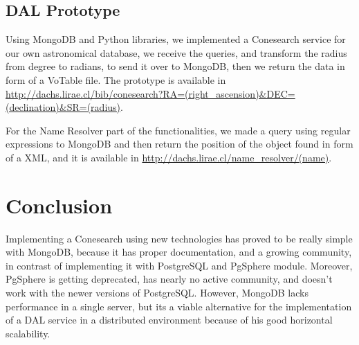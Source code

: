 \documentclass[11pt,twoside]{article}
\begin{document}
\subsection{DAL Prototype}	
  Using MongoDB and Python libraries, we implemented a Conesearch service for our own astronomical database, we receive the queries, and
  transform the radius from degree to radians, to send it over to MongoDB, then we return the data in form of a VoTable file. The prototype is available in
  \url{http://dachs.lirae.cl/bib/conesearch?RA=(right_ascension)&DEC=(declination)&SR=(radius)}.
  
  For the Name Resolver part of the functionalities, we made a query using regular expressions to MongoDB and then return the position
  of the object found in form of a XML, and it is available in \url{http://dachs.lirae.cl/name_resolver/(name)}.

\section{Conclusion}
    Implementing a Conesearch using new technologies has proved to be really
simple with MongoDB, because it has proper documentation, 
and a growing community, in contrast of implementing it with PostgreSQL and
PgSphere module. Moreover,  PgSphere is getting deprecated, has nearly no active
community, and doesn't work with the newer versions of PostgreSQL. 
However,  MongoDB lacks performance in a single server, but its a viable alternative
for the implementation of a DAL service in a distributed environment because of his good horizontal scalability.



\end{document}
